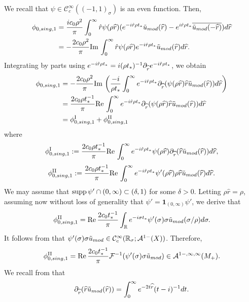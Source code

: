 \documentclass[10pt,a4paper,reqno]{amsart}
\renewcommand{\Im}{\operatorname{Im}}
\renewcommand{\Re}{\operatorname{Re}}
\newcommand{\CcI}{\mathcal{C}_c^\infty}
\newcommand{\RR}{\mathbb{R}}
\renewcommand\Re{\operatorname{Re}}
\newcommand{\A}{\mathcal{A}}
\newcommand{\pa}{\partial}
\newcommand{\ti}{\tilde}
\newcommand{\supp}{\text{supp\,}}
\let\hat\widehat
\theoremstyle{definition}
\theoremstyle{remark}
\numberwithin{equation}{section}
\renewcommand{\Re}{\mathrm{Re}\,}
\renewcommand{\Im}{\mathrm{Im}\,}
\begin{document}
We recall that $\psi\in \CcI((-1,1)_\sigma)$ is an even function. Then,
\[
\begin{split}
    \phi_{0,\rm{sing},1} &= \frac{ic_0\rho^2}{\pi}\int_0^\infty \Hat{r}\psi(\rho\hat{r})(e^{-i\Hat{r}\rho t_*}\ti u_{\rm mod}(\hat{r}) - e^{i\Hat{r}\rho t_*}\overline{ \ti u_{\rm mod}(-\hat{r})}) d\hat{r} \\
    &= -\frac{2c_0\rho^2}{\pi}\Im \int_0^\infty \Hat{r}\psi(\rho\hat{r})e^{-i\Hat{r}\rho t_*}\ti u_{\rm mod}(\hat{r}) d\hat{r}.
\end{split}
\]
Integrating by parts using $e^{-i\Hat{r}\rho t_*}=i(\rho t_*)^{-1}\pa_{\hat{r}}e^{-i\Hat{r}\rho t_*}$, we obtain
\[
\begin{split}
    \phi_{0,\rm{sing},1} &= -\frac{2c_0\rho^2}{\pi}\Im\left( \frac{-i}{\rho t_*} \int_0^\infty e^{-i\Hat{r}\rho t_*} \pa_{\hat{r}} (\psi(\rho\hat{r})\hat{r}\ti u_{\rm mod}(\hat{r})) d\hat{r} \right) \\
    &= \frac{2c_0\rho t_*^{-1}}{\pi} \Re \int_0^\infty e^{-i\Hat{r}\rho t_*} \pa_{\hat{r}} (\psi(\rho\hat{r})\hat{r}\ti u_{\rm mod}(\hat{r})) d\hat{r} \\
    &= \phi_{0,\rm{sing},1}^\text{I} + \phi_{0,\rm{sing},1}^\text{II}
\end{split}
\]
where
\[
    \phi_{0,\rm{sing},1}^\text{I} := \frac{2c_0\rho t_*^{-1}}{\pi} \Re \int_0^\infty e^{-i\Hat{r}\rho t_*} \psi(\rho\hat{r})\pa_{\hat{r}} (\hat{r}\ti u_{\rm mod}(\hat{r})) d\hat{r},
\]
\[
    \phi_{0,\rm{sing},1}^\text{II} := \frac{2c_0\rho t_*^{-1}}{\pi} \Re\int_0^\infty e^{-i\Hat{r}\rho t_*}\psi'(\rho\hat{r})\rho\hat{r}\ti u_{\rm mod}(\hat{r}) d\hat{r}.
\]
We may assume that $\supp\psi' \cap (0,\infty) \subset (\delta,1)$ for some $\delta>0$. Letting $\rho\hat{r} = \rho$, assuming now without loss of generality that $\psi' = \mathbf{1}_{(0,\infty)} \psi'$, we derive that
\[
    \phi_{0,\rm{sing},1}^\text{II} =  \Re\frac{2c_0 t_*^{-1}}{\pi}\int_{\mathbb{R}} e^{-i\sigma t_*}\psi'(\sigma)\sigma\ti u_{\rm mod}(\sigma/\rho) d\sigma.
\]
It follows from \cite[Lemma 2.23]{Hin22} that $\psi'(\sigma)\sigma\ti u_{\rm mod} \in \CcI(\RR_{\sigma}; \A^{1-}(X))$. Therefore,
\begin{equation}
\label{phi0sing1 II}
    \phi_{0,\rm{sing},1}^\text{II} =  \Re\frac{2c_0 t_*^{-1}}{\pi} \mathcal{F}^{-1} (\psi'(\sigma)\sigma\ti u_{\rm mod}) \in \A^{1-,\infty,\infty} (M_+).
\end{equation}
We recall from \cite[Remark 2.25]{Hin22} that
\[
    \pa_{\hat{r}} (\hat{r}\ti u_{\rm mod}(\hat{r})) = \int_0^\infty e^{-2t\hat{r}}(t-i)^{-1}dt.
\]
\end{document}

